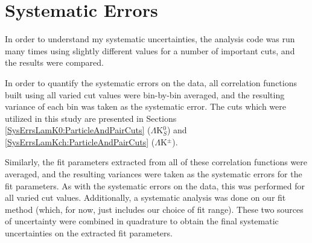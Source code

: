 \documentclass[../AnalysisNoteJBuxton.tex]{subfiles}
\begin{document}
\section{Systematic Errors}
\label{SystematicErrors}

In order to understand my systematic uncertainties, the analysis code was run many times using slightly different values for a number of important cuts, and the results were compared.

\begin{comment}

To quantify the effect, the difference in two correlation functions obtained using different values for a given cut was fit with a simple exponential decay function:

\begin{equation}
  \Delta C(k^{*}) = Ae^{-Bk^{*}}
\label{eqn:ExpDecay}
\end{equation}

The amplitude, $A$, and its associated uncertainty for the various cuts can be found in Tables \ref{tab:LamDcaLamK0} through \ref{tab:AvgSepLamKch}.
The systematic effect of the variation is marked as significant (``Sig" column) if the amplitude is not withih 2$\sigma$ of 0.
Although this proves qualitatively useful, these fits will likely not be used to quantify the systematic effects.

\end{comment}

In order to quantify the systematic errors on the data, all correlation functions built using all varied cut values were bin-by-bin averaged, and the resulting variance of each bin was taken as the systematic error.  The cuts which were utilized in this study are presented in Sections \ref{SysErrsLamK0:ParticleAndPairCuts} ($\Lambda$K$^{0}_{S}$) and \ref{SysErrsLamKch:ParticleAndPairCuts} ($\Lambda$K$^{\pm}$).


Similarly, the fit parameters extracted from all of these correlation functions were averaged, and the resulting variances were taken as the systematic errors for the fit parameters.
As with the systematic errors on the data, this was performed for all varied cut values.
Additionally, a systematic analysis was done on our fit method (which, for now, just includes our choice of fit range).
These two sources of uncertainty were combined in quadrature to obtain the final systematic uncertainties on the extracted fit parameters.





\end{document}
